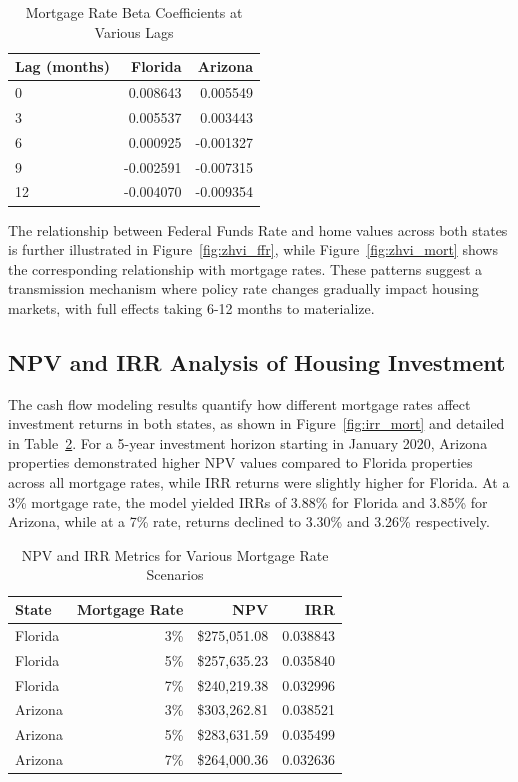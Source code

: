 \documentclass[12pt, stu, abstract]{apa7}
\begin{document}
\begin{table}[htbp]
\centering
\caption{Mortgage Rate Beta Coefficients at Various Lags}
\label{tab:mortgage_lags}
\begin{tabular}{lrr}
\toprule
Lag (months) & Florida & Arizona \\
\midrule
0 & 0.008643 & 0.005549 \\
3 & 0.005537 & 0.003443 \\
6 & 0.000925 & -0.001327 \\
9 & -0.002591 & -0.007315 \\
12 & -0.004070 & -0.009354 \\
\bottomrule
\end{tabular}
\end{table}

The relationship between Federal Funds Rate and home values across both states is further illustrated in Figure~\ref{fig:zhvi_ffr}, while Figure~\ref{fig:zhvi_mort} shows the corresponding relationship with mortgage rates. These patterns suggest a transmission mechanism where policy rate changes gradually impact housing markets, with full effects taking 6-12 months to materialize.

\subsection{NPV and IRR Analysis of Housing Investment}

The cash flow modeling results quantify how different mortgage rates affect investment returns in both states, as shown in Figure~\ref{fig:irr_mort} and detailed in Table~\ref{tab:npv_irr}. For a 5-year investment horizon starting in January 2020, Arizona properties demonstrated higher NPV values compared to Florida properties across all mortgage rates, while IRR returns were slightly higher for Florida. At a 3\% mortgage rate, the model yielded IRRs of 3.88\% for Florida and 3.85\% for Arizona, while at a 7\% rate, returns declined to 3.30\% and 3.26\% respectively.

\begin{table}[htbp]
\centering
\caption{NPV and IRR Metrics for Various Mortgage Rate Scenarios}
\label{tab:npv_irr}
\begin{tabular}{lrrr}
\toprule
State & Mortgage Rate & NPV & IRR \\
\midrule
Florida & 3\% & \$275,051.08 & 0.038843 \\
Florida & 5\% & \$257,635.23 & 0.035840 \\
Florida & 7\% & \$240,219.38 & 0.032996 \\
Arizona & 3\% & \$303,262.81 & 0.038521 \\
Arizona & 5\% & \$283,631.59 & 0.035499 \\
Arizona & 7\% & \$264,000.36 & 0.032636 \\
\bottomrule
\end{tabular}
\end{table}
\end{document}
